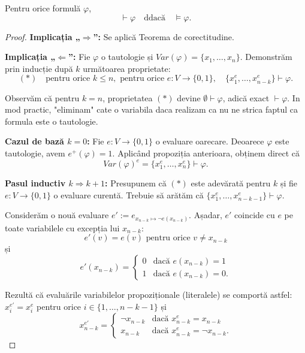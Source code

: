 \newpage


\begin{theorem}
    Pentru orice formulă $\varphi$,
    \[
        \vdash \varphi \quad \text{ddacă} \quad \models \varphi.
    \]
\end{theorem}

\begin{proof}
    \textbf{Implicația „$\Rightarrow$”:} Se aplică Teorema de corectitudine.

    \vspace{0.3cm}
    \textbf{Implicația „$\Leftarrow$”:} Fie $\varphi$ o tautologie și $Var(\varphi) = \{x_1, \dots, x_n\}$. Demonstrăm prin inducție după $k$ următoarea proprietate:
    \begin{equation*}
        (*) \quad \text{pentru orice } k \le n, \text{ pentru orice } e : V \to \{0, 1\}, \quad \{x_1^e, \dots, x_{n-k}^e\} \vdash \varphi.
    \end{equation*}

    Observăm că pentru $k = n$, proprietatea $(*)$ devine $\emptyset \vdash \varphi$, adică exact $\vdash \varphi$.
	In mod practic, "eliminam" cate o variabila daca realizam ca nu ne strica faptul ca formula este o tautologie.

    \vspace{0.3cm}
    \textbf{Cazul de bază $k = 0$:} Fie $e : V \to \{0, 1\}$ o evaluare oarecare. Deoarece $\varphi$ este tautologie, avem $e^+(\varphi) = 1$.
    Aplicând propoziția anterioara, obținem direct că
    \[
        Var(\varphi)^e = \{x_1^e, \dots, x_n^e\} \vdash \varphi.
    \]

    \vspace{0.3cm}
    \textbf{Pasul inductiv $k \Rightarrow k + 1$:} Presupunem că $(*)$ este adevărată pentru $k$ și fie $e : V \to \{0, 1\}$ o evaluare curentă. Trebuie să arătăm că $\{x_1^e, \dots, x_{n-k-1}^e\} \vdash \varphi$.

    Considerăm o nouă evaluare $e' := e_{x_{n-k} \mapsto \neg e(x_{n-k})}$. Așadar, $e'$ coincide cu $e$ pe toate variabilele cu excepția lui $x_{n-k}$:
    \[
        e'(v) = e(v) \text{ pentru orice } v \ne x_{n-k}
    \]
    și
    \[
        e'(x_{n-k}) = \begin{cases}
            0 & \text{dacă } e(x_{n-k}) = 1 \\
            1 & \text{dacă } e(x_{n-k}) = 0.
        \end{cases}
    \]

    Rezultă că evaluările variabilelor propoziționale (literalele) se comportă astfel: $x_i^{e'} = x_i^e$ pentru orice $i \in \{1, \dots, n-k-1\}$ și
    \[
        x_{n-k}^{e'} = \begin{cases}
            \neg x_{n-k} & \text{dacă } x_{n-k}^e = x_{n-k} \\
            x_{n-k} & \text{dacă } x_{n-k}^e = \neg x_{n-k}.
        \end{cases}
    \]


\end{proof}
